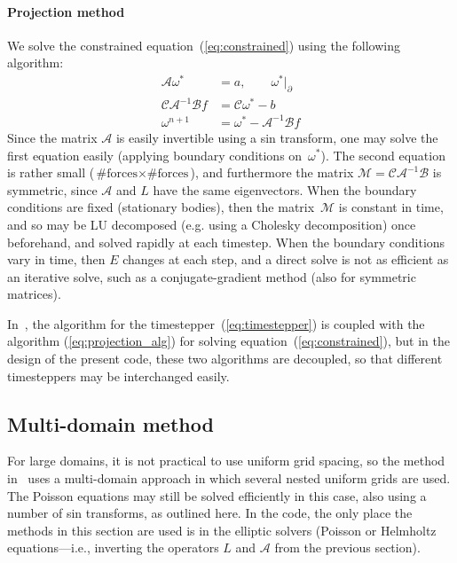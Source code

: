 \documentclass[11pt]{article}
\begin{document}
\paragraph{Projection method}
We solve the constrained equation~(\ref{eq:constrained}) using the following algorithm:
\begin{equation}
\begin{aligned}
	\mathcal{A}\omega^* &= a,\qquad \omega^*\big|_\partial\\
	\mathcal{CA}^{-1}\mathcal{B}f &= \mathcal{C}\omega^* - b\\
	\omega^{n+1} &= \omega^* - \mathcal{A}^{-1}\mathcal{B}f
\end{aligned}
\label{eq:projection_alg}
\end{equation}
Since the matrix $\mathcal{A}$ is easily invertible using a sin transform, one may solve the first equation easily (applying boundary conditions on~$\omega^*$).  The second equation is rather small ($\text{\#forces} \times \text{\#forces}$), and furthermore the matrix $\mathcal{M}=\mathcal{C}\mathcal{A}^{-1}\mathcal{B}$ is symmetric, since $\mathcal{A}$ and $L$ have the same eigenvectors.  When the boundary conditions are fixed (stationary bodies), then the matrix~$\mathcal{M}$ is constant in time, and so may be LU decomposed (e.g. using a Cholesky decomposition) once beforehand, and solved rapidly at each timestep.  When the boundary conditions vary in time, then $E$ changes at each step, and a direct solve is not as efficient as an iterative solve, such as a conjugate-gradient method (also for symmetric matrices).

In~\cite{ColTai-07}, the algorithm for the timestepper~(\ref{eq:timestepper}) is coupled with the algorithm (\ref{eq:projection_alg}) for solving equation~(\ref{eq:constrained}), but in the design of the present code, these two algorithms are decoupled, so that different timesteppers may be interchanged easily.

\subsection{Multi-domain method}
For large domains, it is not practical to use uniform grid spacing, so the method in~\cite{ColTai-07} uses a multi-domain approach in which several nested uniform grids are used.  The Poisson equations may still be solved efficiently in this case, also using a number of sin transforms, as outlined here.  In the code, the only place the methods in this section are used is in the elliptic solvers (Poisson or Helmholtz equations---i.e., inverting the operators $L$ and $\mathcal{A}$ from the previous section).
\end{document}
